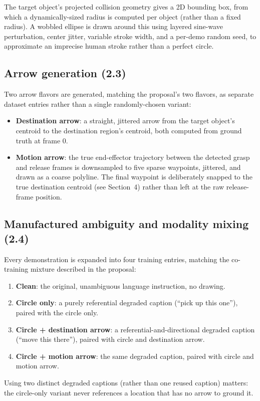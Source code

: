 \documentclass[11pt]{article}
\begin{document}
The target object's projected collision geometry gives a 2D bounding box, from which a dynamically-sized radius is computed per object (rather than a fixed radius). A wobbled ellipse is drawn around this using layered sine-wave perturbation, center jitter, variable stroke width, and a per-demo random seed, to approximate an imprecise human stroke rather than a perfect circle.

\subsection{Arrow generation (2.3)}

Two arrow flavors are generated, matching the proposal's two flavors, as separate dataset entries rather than a single randomly-chosen variant:
\begin{itemize}[nosep]
  \item \textbf{Destination arrow}: a straight, jittered arrow from the target object's centroid to the destination region's centroid, both computed from ground truth at frame 0.
  \item \textbf{Motion arrow}: the true end-effector trajectory between the detected grasp and release frames is downsampled to five sparse waypoints, jittered, and drawn as a coarse polyline. The final waypoint is deliberately snapped to the true destination centroid (see Section~4) rather than left at the raw release-frame position.
\end{itemize}

\subsection{Manufactured ambiguity and modality mixing (2.4)}

Every demonstration is expanded into four training entries, matching the co-training mixture described in the proposal:
\begin{enumerate}[nosep]
  \item \textbf{Clean}: the original, unambiguous language instruction, no drawing.
  \item \textbf{Circle only}: a purely referential degraded caption (``pick up this one''), paired with the circle only.
  \item \textbf{Circle + destination arrow}: a referential-and-directional degraded caption (``move this there''), paired with circle and destination arrow.
  \item \textbf{Circle + motion arrow}: the same degraded caption, paired with circle and motion arrow.
\end{enumerate}
Using two distinct degraded captions (rather than one reused caption) matters: the circle-only variant never references a location that has no arrow to ground it.
\end{document}
